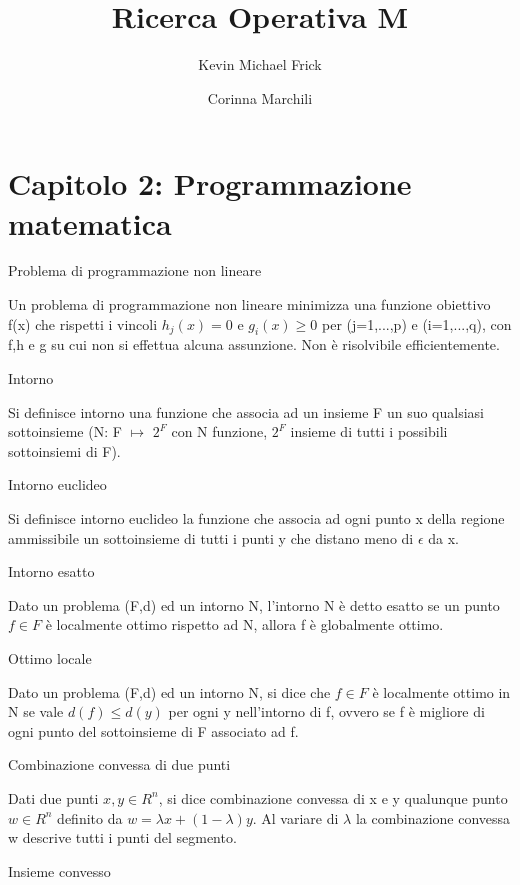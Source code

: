 \documentclass[answers, a4paper, 11pt]{exam}
\title{Ricerca Operativa M}
\author{Kevin Michael Frick \and Corinna Marchili}
\begin{document}
\maketitle

\section{Capitolo 2: Programmazione matematica}
\begin{questions}
\question Problema di programmazione non lineare
\begin{solution}
Un problema di programmazione non lineare minimizza una funzione obiettivo f(x) che rispetti i vincoli $h_j(x)=0$ e $g_i(x)\ge0$ per (j=1,...,p) e (i=1,...,q), con f,h e g su cui non si effettua alcuna assunzione. Non è risolvibile efficientemente.
\end{solution}
\question Intorno
\begin{solution}
Si definisce intorno una funzione che associa ad un insieme F un suo qualsiasi sottoinsieme (N: F $\mapsto$ $2^{F}$ con N funzione, $2^{F}$ insieme di tutti i possibili sottoinsiemi di F).
\end{solution}
\question Intorno euclideo
\begin{solution}
Si definisce intorno euclideo la funzione che associa ad ogni punto x della regione ammissibile un sottoinsieme di tutti i punti y che distano meno di $\epsilon$ da x.
\end{solution}
\question Intorno esatto
\begin{solution}
Dato un problema (F,d) ed un intorno N, l'intorno N è detto esatto se un punto $f \in F$ è localmente ottimo rispetto ad N, allora f è globalmente ottimo.
\end{solution}
\question Ottimo locale
\begin{solution}
Dato un problema (F,d) ed un intorno N, si dice che $f \in F$ è localmente ottimo in N se vale $d(f) \le d(y)$ per ogni y nell'intorno di f, ovvero se f è migliore di ogni punto del sottoinsieme di F associato ad f.  
\end{solution}
\question Combinazione convessa di due punti
\begin{solution}
Dati due punti $x,y \in R^{n}$, si dice combinazione convessa di x e y qualunque punto $w \in R^{n}$ definito da $w= \lambda x+ (1-\lambda) y$. Al variare di $\lambda$ la combinazione convessa w descrive tutti i punti del segmento.
\end{solution}
\question Insieme convesso
\begin{solution}

\end{solution}
\end{questions}
\end{document}
